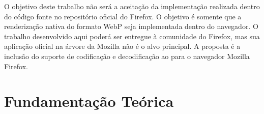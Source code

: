 \documentclass[espaco=simples,appendix=Name]{abnt}
\begin{document}
\begin{description}
O objetivo deste trabalho não será a aceitação da implementação realizada dentro do código fonte no repositório oficial do Firefox. O objetivo é somente que a renderização nativa do formato WebP seja implementada dentro do navegador. O trabalho desenvolvido aqui poderá ser entregue à comunidade do Firefox, mas sua aplicação oficial na árvore da Mozilla não é o alvo principal. A proposta é a inclusão do suporte de codificação e decodificação ao  para o navegador Mozilla Firefox.

\end{description}

\chapter{Fundamentação Teórica}
\end{document}
